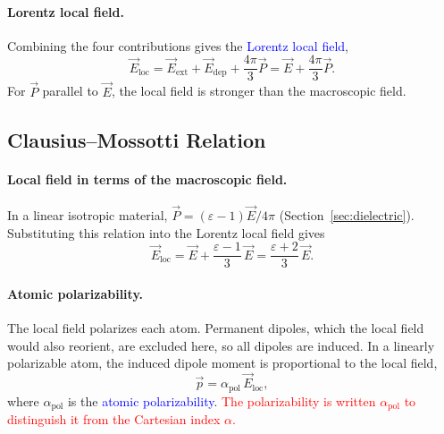 \paragraph{Lorentz local field.}
Combining the four contributions gives the \textcolor{blue}{Lorentz local field},
\begin{equation}
    \boxed{
    \vec E_{\text{loc}} = \vec E_{\text{ext}} + \vec E_{\text{dep}} + \frac{4\pi}{3}\vec P = \vec E + \frac{4\pi}{3}\vec P.
    }
\end{equation}
For $\vec P$ parallel to $\vec E$, the local field is stronger than the macroscopic field.

\subsection{Clausius--Mossotti Relation}

\paragraph{Local field in terms of the macroscopic field.}
In a linear isotropic material, $\vec P = (\varepsilon - 1)\vec E/4\pi$ (Section~\ref{sec:dielectric}). Substituting this relation into the Lorentz local field gives
\begin{equation*}
    \vec E_{\text{loc}} = \vec E + \frac{\varepsilon - 1}{3}\,\vec E = \frac{\varepsilon + 2}{3}\,\vec E.
\end{equation*}

\paragraph{Atomic polarizability.}
The local field polarizes each atom. Permanent dipoles, which the local field would also reorient, are excluded here, so all dipoles are induced. In a linearly polarizable atom, the induced dipole moment is proportional to the local field,
\begin{equation*}
    \vec p = \alpha_{\text{pol}}\,\vec E_{\text{loc}},
\end{equation*}
where $\alpha_{\text{pol}}$ is the \textcolor{blue}{atomic polarizability}. \textcolor{red}{The polarizability is written $\alpha_{\text{pol}}$ to distinguish it from the Cartesian index $\alpha$.}

